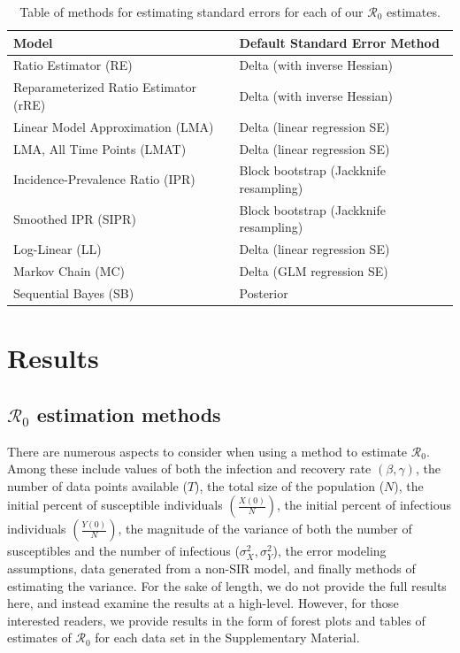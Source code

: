 \documentclass[12pt]{article}
\newcommand{\rr}{\ensuremath{\mathcal{R}_0}}
\begin{document}
\begin{table}[H]
	\centering
	\begin{tabular}{@{}ll@{}}
		\toprule
		\textbf{Model} & \textbf{Default Standard Error Method} \\ \midrule
		Ratio Estimator (RE) & Delta (with inverse Hessian)\\
		Reparameterized Ratio Estimator (rRE) & Delta (with inverse Hessian) \\
		Linear Model Approximation (LMA) & Delta (linear regression SE) \\
		LMA, All Time Points  (LMAT)& Delta (linear regression SE)\\
		Incidence-Prevalence Ratio (IPR) & Block bootstrap (Jackknife resampling) \\
		Smoothed IPR (SIPR) & Block bootstrap (Jackknife resampling) \\
		Log-Linear (LL) & Delta (linear regression SE) \\
		Markov Chain (MC) & Delta (GLM regression SE) \\
		Sequential Bayes (SB) & Posterior\\
		\bottomrule
	\end{tabular}
	\caption{Table of methods for estimating standard errors for each of our $\rr$ estimates.}
	\label{tab:se-methods}
\end{table}



\section{Results}\label{sec:results-top}
\subsection{$\rr$ estimation methods}\label{sec:results}
There are numerous aspects to consider when using a method to estimate $\rr$.  Among these include values of both the infection and recovery rate $(\beta, \gamma)$, the number of data points available ($T$), the total size of the population ($N$), the initial percent of susceptible individuals $\left (\frac{X(0)}{N}\right)$, the initial percent of infectious individuals $\left (\frac{Y(0)}{N}\right )$, the magnitude of the variance of both the number of susceptibles and the number of infectious ($\sigma_X^2, \sigma_Y^2$), the error modeling assumptions, data generated from a non-SIR model, and finally methods of estimating the variance.  For the sake of length, we do not provide the full results here, and instead examine the results at a high-level.  However, for those interested readers, we provide results in the form of forest plots and tables of estimates of $\rr$ for each data set in the Supplementary Material.
\end{document}
